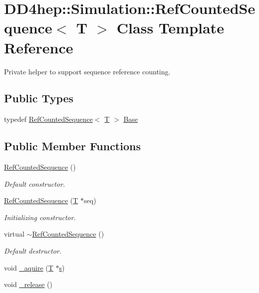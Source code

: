\hypertarget{class_d_d4hep_1_1_simulation_1_1_ref_counted_sequence}{}\section{D\+D4hep\+:\+:Simulation\+:\+:Ref\+Counted\+Sequence$<$ T $>$ Class Template Reference}
\label{class_d_d4hep_1_1_simulation_1_1_ref_counted_sequence}


Private helper to support sequence reference counting.  


\subsection*{Public Types}
\begin{DoxyCompactItemize}
\item 
typedef \hyperlink{class_d_d4hep_1_1_simulation_1_1_ref_counted_sequence}{Ref\+Counted\+Sequence}$<$ \hyperlink{class_t}{T} $>$ \hyperlink{class_d_d4hep_1_1_simulation_1_1_ref_counted_sequence_a04dc466201b2e556a020b1282313876c}{Base}
\end{DoxyCompactItemize}
\subsection*{Public Member Functions}
\begin{DoxyCompactItemize}
\item 
\hyperlink{class_d_d4hep_1_1_simulation_1_1_ref_counted_sequence_aff7f878ef368a341330fe3c5a8fd475d}{Ref\+Counted\+Sequence} ()
\begin{DoxyCompactList}\small\item\em Default constructor. \end{DoxyCompactList}\item 
\hyperlink{class_d_d4hep_1_1_simulation_1_1_ref_counted_sequence_ab5c6370432d98faa4b0ba884afa63add}{Ref\+Counted\+Sequence} (\hyperlink{class_t}{T} $\ast$seq)
\begin{DoxyCompactList}\small\item\em Initializing constructor. \end{DoxyCompactList}\item 
virtual \hyperlink{class_d_d4hep_1_1_simulation_1_1_ref_counted_sequence_a316644b6bcf4dd7e2b57588a9779bf59}{$\sim$\+Ref\+Counted\+Sequence} ()
\begin{DoxyCompactList}\small\item\em Default destructor. \end{DoxyCompactList}\item 
void \hyperlink{class_d_d4hep_1_1_simulation_1_1_ref_counted_sequence_a186785a2a36bfb4dd0468978f4883328}{\+\_\+aquire} (\hyperlink{class_t}{T} $\ast$\hyperlink{_volumes_8cpp_a17ca6bfc8040d695d3cada22a4763d40}{s})
\item 
void \hyperlink{class_d_d4hep_1_1_simulation_1_1_ref_counted_sequence_a81c7e6e88d05887495b28cded6899da9}{\+\_\+release} ()
\end{DoxyCompactItemize}

